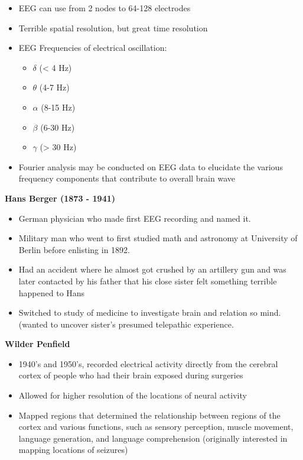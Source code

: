 \documentclass{article}
\begin{document}
\begin{itemize}
    \item EEG can use from 2 nodes to 64-128 electrodes
    \item Terrible spatial resolution, but great time resolution
    \item EEG Frequencies of electrical oscillation:
        \begin{itemize}
            \item $\delta$ (< 4 Hz)
            \item $\theta$ (4-7 Hz)
            \item $\alpha$ (8-15 Hz)
            \item $\beta$ (6-30 Hz)
            \item $\gamma$ (> 30 Hz)
        \end{itemize}
    \item Fourier analysis may be conducted on EEG data to elucidate the various frequency components that contribute to overall brain wave
\end{itemize}

\noindent \textbf{Hans Berger (1873 - 1941)} 
\begin{itemize}
    \item German physician who made first EEG recording and named it. 
    \item Military man who went to first studied math and astronomy at University of Berlin before enlisting in 1892. 
    \item Had an accident where he almost got crushed by an artillery gun and was later contacted by his father that his close sister felt something terrible happened to Hans 
    \item Switched to study of medicine to investigate brain and relation so mind. (wanted to uncover sister's presumed telepathic experience. \\
\end{itemize}


\noindent \textbf{Wilder Penfield} 
\begin{itemize}
    \item 1940's and 1950's, recorded electrical activity directly from the cerebral cortex of people who had their brain exposed during surgeries
    \item Allowed for higher resolution of the locations of neural activity
    \item Mapped regions that determined the relationship between regions of the cortex and various functions, such as sensory perception, muscle movement, language generation, and language comprehension (originally interested in mapping locations of seizures)  
\end{itemize}
\end{document}
